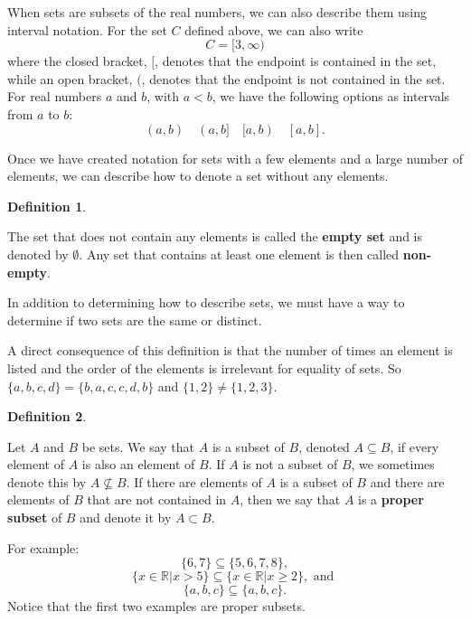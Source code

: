 \documentclass[
]{book}
\theoremstyle{definition}
\newtheorem{definition}{Definition}[chapter]
\theoremstyle{definition}
\theoremstyle{definition}
\theoremstyle{definition}
\theoremstyle{remark}
\begin{document}
When sets are subsets of the real numbers, we can also describe them using interval notation. For the set \(C\) defined above, we can also write
\[C=[3,\infty)\] where the closed bracket, \([\), denotes that the endpoint is contained in the set, while an open bracket, \((\), denotes that the endpoint is not contained in the set. For real numbers \(a\) and \(b\), with \(a<b\), we have the following options as intervals from \(a\) to \(b\):
\[ (a,b) \quad (a,b] \quad [a,b) \quad [a,b] .\]

Once we have created notation for sets with a few elements and a large number of elements, we can describe how to denote a set without any elements.

\begin{definition}
\protect\hypertarget{def:unlabeled-div-3}{}\label{def:unlabeled-div-3}

The set that does not contain any elements is called the \textbf{empty set} and is denoted by \(\emptyset\). Any set that contains at least one element is then called \textbf{non-empty}.

\end{definition}

In addition to determining how to describe sets, we must have a way to determine if two sets are the same or distinct.

A direct consequence of this definition is that the number of times an element is listed and the order of the elements is irrelevant for equality of sets. So \(\{a, b, c, d\}=\{b, a, c, c, d, b\}\) and \(\{1, 2\} \neq \{1, 2, 3\}\).

\begin{definition}
\protect\hypertarget{def:subset}{}\label{def:subset}

Let \(A\) and \(B\) be sets. We say that \(A\) is a subset of \(B\), denoted \(A \subseteq B\), if every element of \(A\) is also an element of \(B\). If \(A\) is not a subset of \(B\), we sometimes denote this by \(A\nsubseteq B\). If there are elements of \(A\) is a subset of \(B\) and there are elements of \(B\) that are not contained in \(A\), then we say that \(A\) is a \textbf{proper subset} of \(B\) and denote it by \(A\subset B\).

\end{definition}

For example:
\[\{6, 7 \} \subseteq \{5, 6, 7, 8\},\]
\[\{x\in \mathbb{R} \vert x>5\} \subseteq \{x\in \mathbb{R} \vert x \geq 2\}, \mbox{ and }\]
\[\{a,b,c\} \subseteq \{a,b,c\}.\]
Notice that the first two examples are proper subsets.
\end{document}
